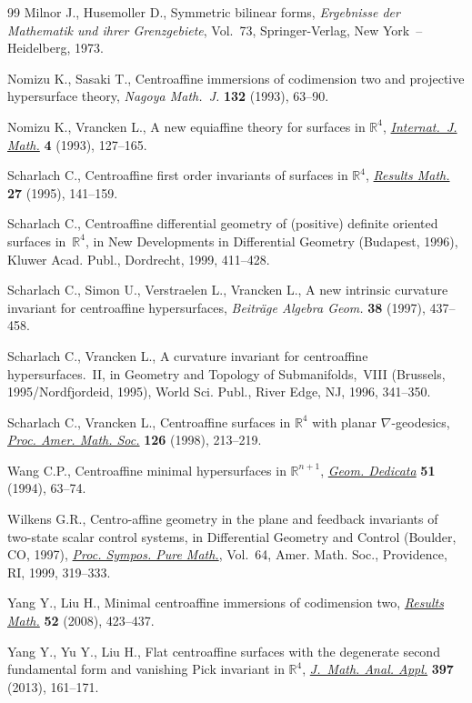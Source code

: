 \begin{thebibliography}{99}
Milnor J., Husemoller D., Symmetric bilinear forms, \textit{Ergebnisse der
  Mathematik und ihrer Grenzgebiete}, Vol.~73, Springer-Verlag, New York~--
  Heidelberg, 1973.

Nomizu K., Sasaki T., Centroaffine immersions of codimension two and projective
  hypersurface theory, \textit{Nagoya Math.~J.} \textbf{132} (1993), 63--90.

Nomizu K., Vrancken L., A new equiaffine theory for surfaces in {${\mathbb
  R}^4$}, \href{http://dx.doi.org/10.1142/S0129167X9300008X}{\textit{Internat.~J. Math.}} \textbf{4} (1993), 127--165.

Scharlach C., Centroaffine first order invariants of surfaces in {${\mathbb
  R}^4$}, \href{http://dx.doi.org/10.1007/BF03322278}{\textit{Results Math.}} \textbf{27} (1995), 141--159.

Scharlach C., Centroaffine differential geometry of (positive) definite
  oriented surfaces in~{${\mathbb R}^4$}, in New De\-ve\-lop\-ments in Differential
  Geometry ({B}udapest, 1996), Kluwer Acad. Publ., Dordrecht, 1999, 411--428.

Scharlach C., Simon U., Verstraelen L., Vrancken L., A new intrinsic curvature
  invariant for centroaffine hypersurfaces, \textit{Beitr\"age Algebra Geom.}
  \textbf{38} (1997), 437--458.

Scharlach C., Vrancken L., A curvature invariant for centroaffine
  hypersurfaces.~{II}, in Geometry and Topo\-lo\-gy of Submanifolds,~{VIII}
  ({B}russels, 1995/{N}ordfjordeid, 1995), World Sci. Publ., River Edge, NJ,
  1996, 341--350.

Scharlach C., Vrancken L., Centroaffine surfaces in {${\mathbb R}^4$} with
  planar {$\nabla$}-geodesics, \href{http://dx.doi.org/10.1090/S0002-9939-98-04408-6}{\textit{Proc. Amer. Math. Soc.}} \textbf{126}
  (1998), 213--219.

Wang C.P., Centroaffine minimal hypersurfaces in {${\mathbb R}^{n+1}$},
  \href{http://dx.doi.org/10.1007/BF01264101}{\textit{Geom. Dedicata}} \textbf{51} (1994), 63--74.

Wilkens G.R., Centro-affine geometry in the plane and feedback invariants of
  two-state scalar control systems, in Differential Geometry and Control
  ({B}oulder, {CO}, 1997), \href{http://dx.doi.org/10.1090/pspum/064/1654544}{\textit{Proc. Sympos. Pure Math.}}, Vol.~64, Amer.
  Math. Soc., Providence, RI, 1999, 319--333.

Yang Y., Liu H., Minimal centroaffine immersions of codimension two,
  \href{http://dx.doi.org/10.1007/s00025-008-0321-5}{\textit{Results Math.}} \textbf{52} (2008), 423--437.

Yang Y., Yu Y., Liu H., Flat centroaffine surfaces with the degenerate second
  fundamental form and vani\-shing {P}ick invariant in {$\mathbb{R}^4$},
  \href{http://dx.doi.org/10.1016/j.jmaa.2012.07.047}{\textit{J.~Math. Anal. Appl.}} \textbf{397} (2013), 161--171.

\end{thebibliography}
